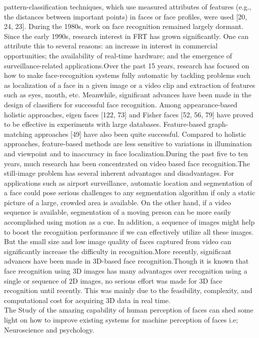 \documentclass[12pt,a4paper]{book}
\begin{document}
pattern-classification techniques, which use measured attributes of features
(e.g., the distances between important points) in faces or face profiles, were
used [20, 24, 23]. During the 1980s, work on face recognition remained largely
dormant. Since the early 1990s, research interest in FRT has grown significantly.
One can attribute this to several reasons: an increase in interest in commercial
opportunities; the availability of real-time hardware; and the emergence of
surveillance-related applications.Over the past 15 years, research has focused on how to make face-recognition
systems fully automatic by tackling problems such as localization of a face in
a given image or a video clip and extraction of features such as eyes, mouth,
etc. Meanwhile, significant advances have been made in the design of classifiers
for successful face recognition. Among appearance-based holistic approaches,
eigen faces [122, 73] and Fisher faces [52, 56, 79] have proved to be effective in
experiments with large databases. Feature-based graph-matching approaches [49]
have also been quite successful. Compared to holistic approaches, feature-based methods are less sensitive to variations in illumination and viewpoint and to inaccuracy
in face localization.During the past five to ten years, much research has been concentrated on video based
face recognition.The still-image problem has several inherent advantages
and disadvantages. For applications such as airport surveillance, automatic location
and segmentation of a face could pose serious challenges to any segmentation
algorithm if only a static picture of a large, crowded area is available. On the other
hand, if a video sequence is available, segmentation of a moving person can be
more easily accomplished using motion as a cue. In addition, a sequence of images
might help to boost the recognition performance if we can effectively utilize all
these images. But the small size and low image quality of faces captured from
video can significantly increase the difficulty in recognition.More recently, significant advances have been made in 3D-based face recognition.Though it is known that face recognition using 3D images has many
advantages over recognition using a single or sequence of 2D images, no serious
effort was made for 3D face recognition until recently. This was mainly due
to the feasibility, complexity, and computational cost for acquiring 3D data in
real time.\\
The Study of the amazing capability of human
perception of faces can shed some light on how to improve existing systems
for machine perception of faces i.e; Neuroscience and psychology.\\
\end{document}
